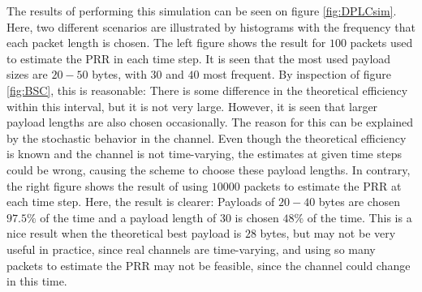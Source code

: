 The results of performing this simulation can be seen on figure \ref{fig:DPLCsim}. Here, two different scenarios are illustrated by histograms with the frequency that each packet length is chosen. The left figure shows the result for $100$ packets used to estimate the PRR in each time step. It is seen that the most used payload sizes are $20-50$ bytes, with $30$ and $40$ most frequent. By inspection of figure \ref{fig:BSC}, this is reasonable: There is some difference in the theoretical efficiency within this interval, but it is not very large. However, it is seen that larger payload lengths are also chosen occasionally. The reason for this can be explained by the stochastic behavior in the channel. Even though the theoretical efficiency is known and the channel is not time-varying, the estimates at given time steps could be wrong, causing the scheme to choose these payload lengths. In contrary, the right figure shows the result of using $10000$ packets to estimate the PRR at each time step. Here, the result is clearer: Payloads of $20-40$ bytes are chosen $97.5\%$ of the time and a payload length of $30$ is chosen $48\%$ of the time. This is a nice result when the theoretical best payload is $28$ bytes, but may not be very useful in practice, since real channels are time-varying, and using so many packets to estimate the PRR may not be feasible, since the channel could change in this time.

